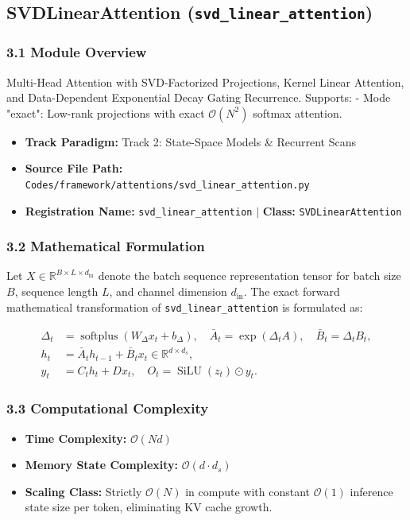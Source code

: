 \subsection{SVDLinearAttention (\texttt{svd\_linear\_attention})}
\label{sec:app_module_svd_linear_attention}

\subsubsection*{3.1 Module Overview}
Multi-Head Attention with SVD-Factorized Projections, Kernel Linear Attention, and Data-Dependent Exponential Decay Gating Recurrence.  Supports: - Mode "exact": Low-rank projections with exact $\mathcal{O}(N^2)$ softmax attention.
\begin{itemize}
    \item \textbf{Track Paradigm:} Track 2: State-Space Models \& Recurrent Scans
    \item \textbf{Source File Path:} \texttt{Codes/framework/attentions/svd\_linear\_attention.py}
    \item \textbf{Registration Name:} \texttt{svd\_linear\_attention} $\mid$ \textbf{Class:} \texttt{SVDLinearAttention}
\end{itemize}

\subsubsection*{3.2 Mathematical Formulation}
Let $X \in \mathbb{R}^{B \times L \times d_{\text{in}}}$ denote the batch sequence representation tensor for batch size $B$, sequence length $L$, and channel dimension $d_{\text{in}}$. The exact forward mathematical transformation of \texttt{svd\_linear\_attention} is formulated as:

\begin{align}
\Delta_t &= \operatorname{softplus}(W_\Delta x_t + b_\Delta), \quad \bar{A}_t = \exp(\Delta_t A), \quad \bar{B}_t = \Delta_t B_t, \\
h_t &= \bar{A}_t h_{t-1} + \bar{B}_t x_t \in \mathbb{R}^{d \times d_s}, \\
y_t &= C_t h_t + D x_t, \quad O_t = \operatorname{SiLU}(z_t) \odot y_t.
\end{align}


\subsubsection*{3.3 Computational Complexity}
\begin{itemize}
    \item \textbf{Time Complexity:} $\mathcal{O}(N d)$
    \item \textbf{Memory State Complexity:} $\mathcal{O}(d \cdot d_s)$
    \item \textbf{Scaling Class:} Strictly $\mathcal{O}(N)$ in compute with constant $\mathcal{O}(1)$ inference state size per token, eliminating KV cache growth.
\end{itemize}

